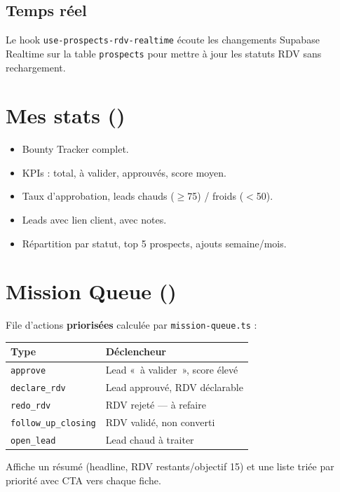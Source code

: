 \documentclass[11pt,a4paper]{report}
\begin{document}
\subsection{Temps réel}

Le hook \texttt{use-prospects-rdv-realtime} écoute les changements Supabase Realtime sur la table \texttt{prospects} pour mettre à jour les statuts RDV sans rechargement.

\section{Mes stats ()}

\begin{itemize}[noitemsep]
  \item Bounty Tracker complet.
  \item KPIs : total, à valider, approuvés, score moyen.
  \item Taux d'approbation, leads chauds ($\geq$75) / froids ($<$50).
  \item Leads avec lien client, avec notes.
  \item Répartition par statut, top 5 prospects, ajouts semaine/mois.
\end{itemize}

\section{Mission Queue ()}

File d'actions \textbf{priorisées} calculée par \texttt{mission-queue.ts} :

\begin{table}[h]
\centering
\begin{tabular}{@{}ll@{}}
\toprule
\textbf{Type} & \textbf{Déclencheur} \\
\midrule
\texttt{approve} & Lead «~à valider~», score élevé \\
\texttt{declare\_rdv} & Lead approuvé, RDV déclarable \\
\texttt{redo\_rdv} & RDV rejeté --- à refaire \\
\texttt{follow\_up\_closing} & RDV validé, non converti \\
\texttt{open\_lead} & Lead chaud à traiter \\
\bottomrule
\end{tabular}
\end{table}

Affiche un résumé (headline, RDV restants/objectif 15) et une liste triée par priorité avec CTA vers chaque fiche.
\end{document}
